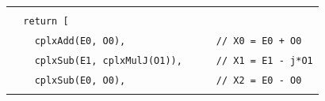 \documentclass[
]{article}
\newcommand{\passthrough}[1]{#1}
\begin{document}
\begin{longtable}[]{@{}
  >{\raggedright\arraybackslash}p{}@{}}
\begin{minipage}[t]{\linewidth}
\passthrough{\lstinline!  !}\passthrough{\lstinline!const!}\passthrough{\lstinline! !}\passthrough{\lstinline!O!}\passthrough{\lstinline!1!}\passthrough{\lstinline! !}\passthrough{\lstinline!=!}\passthrough{\lstinline! !}\passthrough{\lstinline!cplxSub!}\passthrough{\lstinline!(!}\passthrough{\lstinline!x!}\passthrough{\lstinline![1],!}\passthrough{\lstinline! !}\passthrough{\lstinline!x!}\passthrough{\lstinline![3]);!}\passthrough{\lstinline!   !}\passthrough{\lstinline!//!}\passthrough{\lstinline! !}\passthrough{\lstinline!x!}\passthrough{\lstinline!1!}\passthrough{\lstinline! !}\passthrough{\lstinline!-!}\passthrough{\lstinline! !}\passthrough{\lstinline!x!}\passthrough{\lstinline!3!}\strut \\
\passthrough{\lstinline!  !}\passthrough{\lstinline!return!}\passthrough{\lstinline! !}\passthrough{\lstinline![!}\strut \\
\passthrough{\lstinline!    !}\passthrough{\lstinline!cplxAdd!}\passthrough{\lstinline!(!}\passthrough{\lstinline!E!}\passthrough{\lstinline!0,!}\passthrough{\lstinline! !}\passthrough{\lstinline!O!}\passthrough{\lstinline!0),!}\passthrough{\lstinline!                !}\passthrough{\lstinline!//!}\passthrough{\lstinline! !}\passthrough{\lstinline!X!}\passthrough{\lstinline!0!}\passthrough{\lstinline! !}\passthrough{\lstinline!=!}\passthrough{\lstinline! !}\passthrough{\lstinline!E!}\passthrough{\lstinline!0!}\passthrough{\lstinline! !}\passthrough{\lstinline!+!}\passthrough{\lstinline! !}\passthrough{\lstinline!O!}\passthrough{\lstinline!0!}\strut \\
\passthrough{\lstinline!    !}\passthrough{\lstinline!cplxSub!}\passthrough{\lstinline!(!}\passthrough{\lstinline!E!}\passthrough{\lstinline!1,!}\passthrough{\lstinline! !}\passthrough{\lstinline!cplxMulJ!}\passthrough{\lstinline!(!}\passthrough{\lstinline!O!}\passthrough{\lstinline!1)),!}\passthrough{\lstinline!      !}\passthrough{\lstinline!//!}\passthrough{\lstinline! !}\passthrough{\lstinline!X!}\passthrough{\lstinline!1!}\passthrough{\lstinline! !}\passthrough{\lstinline!=!}\passthrough{\lstinline! !}\passthrough{\lstinline!E!}\passthrough{\lstinline!1!}\passthrough{\lstinline! !}\passthrough{\lstinline!-!}\passthrough{\lstinline! !}\passthrough{\lstinline!j!}\passthrough{\lstinline!*!}\passthrough{\lstinline!O!}\passthrough{\lstinline!1!}\strut \\
\passthrough{\lstinline!    !}\passthrough{\lstinline!cplxSub!}\passthrough{\lstinline!(!}\passthrough{\lstinline!E!}\passthrough{\lstinline!0,!}\passthrough{\lstinline! !}\passthrough{\lstinline!O!}\passthrough{\lstinline!0),!}\passthrough{\lstinline!                !}\passthrough{\lstinline!//!}\passthrough{\lstinline! !}\passthrough{\lstinline!X!}\passthrough{\lstinline!2!}\passthrough{\lstinline! !}\passthrough{\lstinline!=!}\passthrough{\lstinline! !}\passthrough{\lstinline!E!}\passthrough{\lstinline!0!}\passthrough{\lstinline! !}\passthrough{\lstinline!-!}\passthrough{\lstinline! !}\passthrough{\lstinline!O!}\passthrough{\lstinline!0!}\strut \\

\end{minipage}
\end{longtable}
\end{document}
